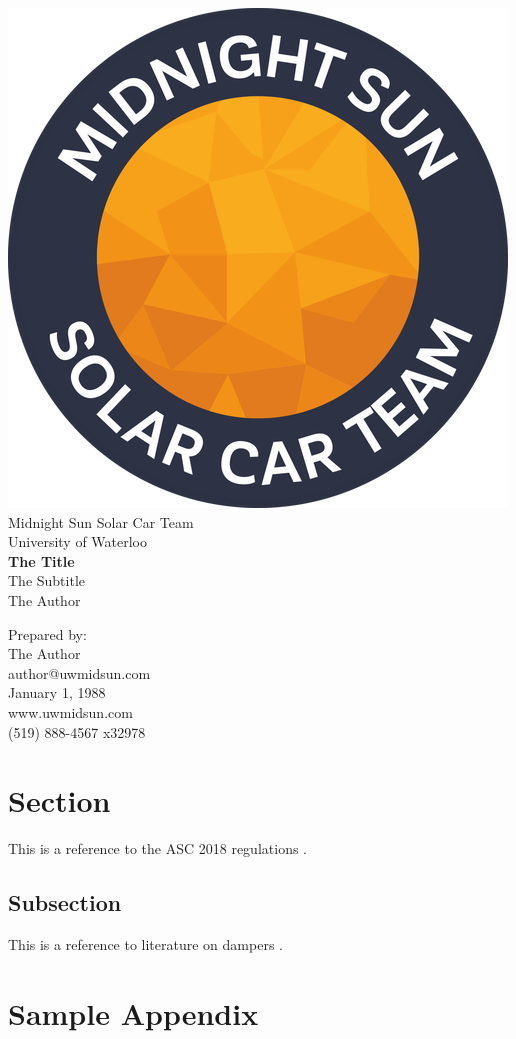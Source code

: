 \documentclass[10pt]{article}
\makeatletter
\newcommand\theteamname{Midnight Sun Solar Car Team} %
\newcommand\theuniversityname{University of Waterloo} %
\newcommand\theteamwebsite{www.uwmidsun.com} %
\newcommand\theteamphone{(519) 888-4567 x32978} %
\newcommand\thetitle{The Title} %
\newcommand\thesubtitle{The Subtitle} %
\newcommand\theauthor{The Author} %
\newcommand\theauthorcontact{author@uwmidsun.com} %
\newcommand\thedate{January 1, 1988} %
\makeatother
\begin{document}
\begin{titlepage}
\large
\vspace*{2cm}
\centering
\includegraphics[width=.25\textwidth]{./figures/midnightSunLogoCircle.png} \\
\vspace{1.5cm}
{\LARGE \theteamname} \\
\theuniversityname \\
\vspace{2.2cm}
{\huge\bfseries \thetitle} \\
\vspace{0.2cm}
{\LARGE \thesubtitle} \\
\vspace{2.2cm}
\ifdefined \theauthor
\par Prepared by: \\
\theauthor \\
\theauthorcontact \\
\fi
\thedate \\
\vfill
\theteamwebsite \\
\theteamphone
\end{titlepage}

\tableofcontents

\section{Section}
This is a reference to the ASC 2018 regulations \cite{ASC2018regs}.

\subsection{Subsection}
This is a reference to literature on dampers \cite{dampers}.

\clearpage
\printbibliography

\clearpage
\appendix
\section{Sample Appendix}
\label{app:simple}

\end{document}
